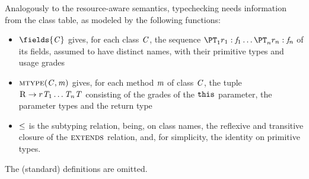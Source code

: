  Analogously to the resource-aware semantics, typechecking needs information from the class table, as modeled by the following functions:
\begin{itemize}
\item $\fields{\C}$ gives, for each class $\mathit{C}$, the sequence $\Field{\Graded{\PT_1}{}{\rgr_1}}{\f_1} \ldots \Field{\Graded{\PT_n}{}{\rgr_n}}{\f_n}$ of its fields,  assumed to have distinct names,   with their primitive types and usage grades
\item  $\textsc{mtype}(\mathit{C},\mathit{m})$ gives, for each method $\mathit{m}$ of class $\mathit{C}$, the tuple $\textsc{R}\rightarrow r{\mathit{T}_1\ldots\mathit{T}_n}{\mathit{T}}$ consisting of the grades of the $\texttt{this}$ parameter, the parameter types and the return type 
\item $\leq$ is the subtyping relation, being, on class names, the reflexive and transitive closure of the $\textsc{extends}$ relation, and, for simplicity, the identity on primitive types. 
\end{itemize}
The (standard) definitions are omitted.

